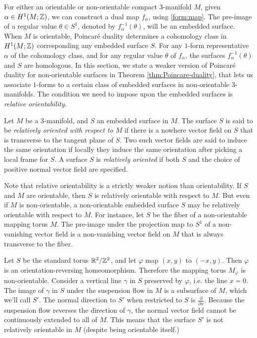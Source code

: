 For either an orientable or non-orientable compact 3-manifold $M$, given $\alpha\in H^1(M; \mathbb{Z})$, we can construct a dual map $f_\alpha$, using \eqref{form:map}.
The pre-image of a regular value $\theta \in S^1$, denoted by $f_{\alpha}^{-1}(\theta)$, will be an embedded surface.
When $M$ is orientable, Poincar\'e duality determines a cohomology class in $H^1(M; \mathbb{Z})$ corresponding any embedded surface $S$.
For any $1$-form representative $\alpha$ of the cohomology class, and for any regular value $\theta$ of $f_{\alpha}$, the surfaces $f_{\alpha}^{-1}(\theta)$ and $S$ are homologous.
In this section, we state a weaker version of Poincar\'e duality for non-orientable surfaces in Theorem \ref{thm:Poincare-duality}, that lets us associate $1$-forms to a certain class of embedded surfaces in non-orientable $3$-manifolds.
The condition we need to impose upon the embedded surfaces is \emph{relative orientability}.

\begin{defn}
  Let $M$ be a $3$-manifold, and $S$ an embedded surface in $M$.
  The surface $S$ is said to be \emph{relatively oriented with respect to $M$} if there is a nowhere vector field on $S$ that is transverse to the tangent plane of $S$.
  Two such vector fields are said to induce the same orientation if locally they induce the same orientation after picking a local frame for $S$.
  A surface $S$ is \emph{relatively oriented} if both $S$ and the choice of positive normal vector field are specified.
\end{defn}
Note that relative orientability is a strictly weaker notion than orientability.
If $S$ and $M$ are orientable, then $S$ is relatively orientable with respect to $M$.
But even if $M$ is non-orientable, a non-orientable embedded surface $S$ may be relatively orientable with respect to $M$.
For instance, let $S$ be the fiber of a non-orientable mapping torus $M$.
The pre-image under the projection map to $S^1$ of a non-vanishing vector field is a non-vanishing vector field on $M$ that is always transverse to the fiber.

\begin{example}
  Let $S$ be the standard torus $\mathbb{R}^2/\mathbb{Z}^2$, and let $\varphi$ map $(x,y)$ to $(-x, y)$.
  Then $\varphi$ is an orientation-reversing homeomorphism.
  Therefore the mapping torus $M_\varphi$ is non-orientable.
  Consider a vertical line $\gamma$ in $S$ preserved by $\varphi$, i.e. the line
  $x = 0$.
  The image of $\gamma$ in $S$ under the suspension flow in $M$ is a subsurface of $M$, which we'll call $S'$.
  The normal direction to $S'$ when restricted to $S$ is $\frac{\partial}{\partial x}$.
  Because the suspension flow reverses the direction of $\gamma$, the normal vector field cannot be continuously extended to all of $M$.
  This means that the surface $S'$ is not relatively orientable in $M$ (despite being orientable itself.)
\end{example}

